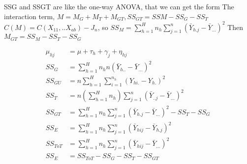SSG and SSGT are like the one-way ANOVA, that we can get the form
The interaction term, $M = M_G + M_T + M_{GT}, SS_{GT} = SSM - SS_G - SS_T $
$C(M) = C(X_{11},.. X_{ab}) - J_{n}$, so $SS_M = \sum_{h=1}^H n_h \sum_{j=1}^n (\bar{Y}_{h.j} - \bar{Y}_{…})^2$
Then $M_{GT} = SS_M - SS_T - SS_G$

\begin{align*}
\mu_{hj} &= \mu + \tau_h + \gamma_{j} + \eta_{hj} \\
SS_G &= \sum_{h=1}^H n_h n (\bar{Y}_{h..} - \bar{Y}_{…})^2 \\
SS_{GU} &= n \sum_{h=1}^H \sum_{i=1}^{n_h} (Y_{hi.} - Y_{h.})^2 \\
SS_T &= n (\sum_{h=1}^{H} n_h) \sum_{j=1}^n (\bar{Y}_{..j} - \bar{Y}_{…})^2 \\
SS_{GT} &= \sum_{h=1}^H n_h \sum_{j=1}^n (\bar{Y}_{h.j} - \bar{Y}_{…})^2 - SS_T- SS_G \\
SS_E &= \sum_{h=1}^H n_h \sum_{j=1}^n (\bar{Y}_{hij} - \bar{Y}_{h.j})^2 \\
SS_{ToT} &= \sum_{h=1}^H n_h \sum_{j=1}^n (\bar{Y}_{hij} - \bar{Y}_{…})^2 \\
SS_E &= SS_{ToT} - SS_G -SS_T - SS_{GT}
\end{align*}